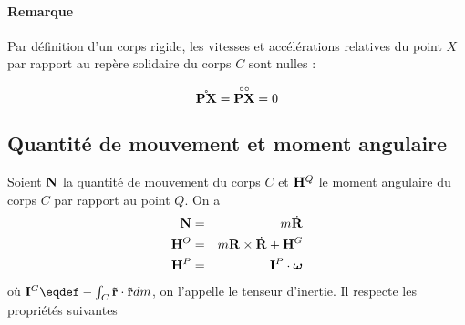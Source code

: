 \paragraph{Remarque}
Par définition d'un corps rigide, les vitesses et accélérations relatives du point $X$
par rapport au repère solidaire du corps $C$ sont nulles :

$$\mathring{\bf PX} = \overset{\circ\circ}{\bf PX} = 0$$

\subsection{Quantité de mouvement et moment angulaire}
Soient ${\bf N}$ la quantité de mouvement du corps $C$ et ${\bf H}^Q$ le moment angulaire du corps $C$ par rapport au point $Q$.
On a
\begin{eqnarray*}
  {\bf N} &=& m \dot{\bf R}\\
  {\bf H}^O &=& m {\bf R} \times \dot{\bf R} + {\bf H}^G\\
  {\bf H}^P &=& {\bf I}^P \cdot {\bm \omega}
\end{eqnarray*}
où $\ine^G \eqdef -\int_C \tilde{\fv{r}}\cdot\tilde{\fv{r}} dm$, on l'appelle le tenseur d'inertie.
Il respecte les propriétés suivantes


